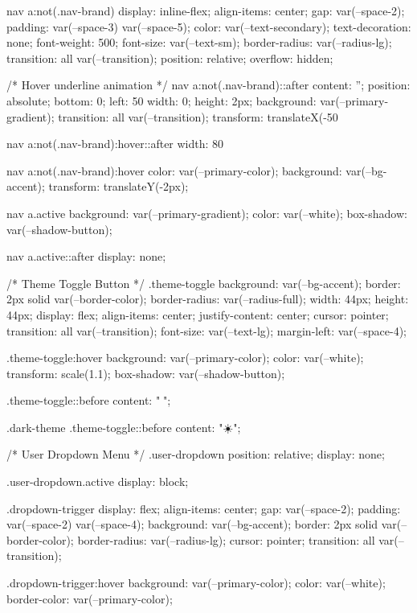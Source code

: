nav a:not(.nav-brand) {
  display: inline-flex;
  align-items: center;
  gap: var(--space-2);
  padding: var(--space-3) var(--space-5);
  color: var(--text-secondary);
  text-decoration: none;
  font-weight: 500;
  font-size: var(--text-sm);
  border-radius: var(--radius-lg);
  transition: all var(--transition);
  position: relative;
  overflow: hidden;
}

/* Hover underline animation */
nav a:not(.nav-brand)::after {
  content: '';
  position: absolute;
  bottom: 0;
  left: 50%
  width: 0;
  height: 2px;
  background: var(--primary-gradient);
  transition: all var(--transition);
  transform: translateX(-50%
}

nav a:not(.nav-brand):hover::after {
  width: 80%
}

nav a:not(.nav-brand):hover {
  color: var(--primary-color);
  background: var(--bg-accent);
  transform: translateY(-2px);
}

nav a.active {
  background: var(--primary-gradient);
  color: var(--white);
  box-shadow: var(--shadow-button);
}

nav a.active::after {
  display: none;
}

/* Theme Toggle Button */
.theme-toggle {
  background: var(--bg-accent);
  border: 2px solid var(--border-color);
  border-radius: var(--radius-full);
  width: 44px;
  height: 44px;
  display: flex;
  align-items: center;
  justify-content: center;
  cursor: pointer;
  transition: all var(--transition);
  font-size: var(--text-lg);
  margin-left: var(--space-4);
}

.theme-toggle:hover {
  background: var(--primary-color);
  color: var(--white);
  transform: scale(1.1);
  box-shadow: var(--shadow-button);
}

.theme-toggle::before {
  content: "🌙";
}

.dark-theme .theme-toggle::before {
  content: "☀️";
}

/* User Dropdown Menu */
.user-dropdown {
  position: relative;
  display: none;
}

.user-dropdown.active {
  display: block;
}

.dropdown-trigger {
  display: flex;
  align-items: center;
  gap: var(--space-2);
  padding: var(--space-2) var(--space-4);
  background: var(--bg-accent);
  border: 2px solid var(--border-color);
  border-radius: var(--radius-lg);
  cursor: pointer;
  transition: all var(--transition);
}

.dropdown-trigger:hover {
  background: var(--primary-color);
  color: var(--white);
  border-color: var(--primary-color);
}


